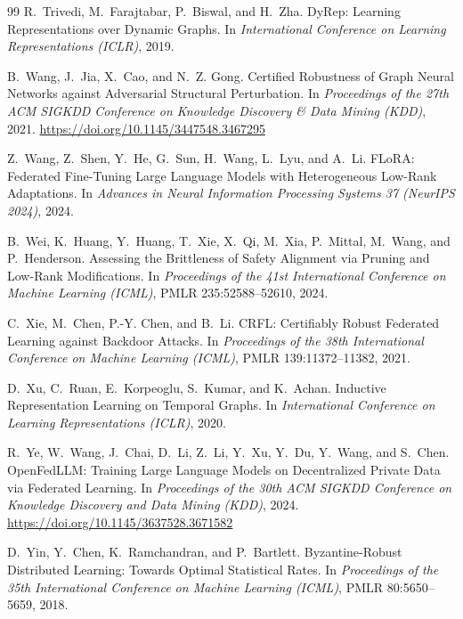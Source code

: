 \begin{thebibliography}{99}
R.~Trivedi, M.~Farajtabar, P.~Biswal, and H.~Zha.
\newblock DyRep: Learning Representations over Dynamic Graphs.
\newblock In \emph{International Conference on Learning Representations (ICLR)}, 2019.

B.~Wang, J.~Jia, X.~Cao, and N.~Z. Gong.
\newblock Certified Robustness of Graph Neural Networks against Adversarial Structural Perturbation.
\newblock In \emph{Proceedings of the 27th ACM SIGKDD Conference on Knowledge Discovery \& Data Mining (KDD)}, 2021.
\newblock \url{https://doi.org/10.1145/3447548.3467295}

Z.~Wang, Z.~Shen, Y.~He, G.~Sun, H.~Wang, L.~Lyu, and A.~Li.
\newblock FLoRA: Federated Fine-Tuning Large Language Models with Heterogeneous Low-Rank Adaptations.
\newblock In \emph{Advances in Neural Information Processing Systems 37 (NeurIPS 2024)}, 2024.

B.~Wei, K.~Huang, Y.~Huang, T.~Xie, X.~Qi, M.~Xia, P.~Mittal, M.~Wang, and P.~Henderson.
\newblock Assessing the Brittleness of Safety Alignment via Pruning and Low-Rank Modifications.
\newblock In \emph{Proceedings of the 41st International Conference on Machine Learning (ICML)}, PMLR 235:52588--52610, 2024.

C.~Xie, M.~Chen, P.-Y. Chen, and B.~Li.
\newblock CRFL: Certifiably Robust Federated Learning against Backdoor Attacks.
\newblock In \emph{Proceedings of the 38th International Conference on Machine Learning (ICML)}, PMLR 139:11372--11382, 2021.

D.~Xu, C.~Ruan, E.~Korpeoglu, S.~Kumar, and K.~Achan.
\newblock Inductive Representation Learning on Temporal Graphs.
\newblock In \emph{International Conference on Learning Representations (ICLR)}, 2020.

R.~Ye, W.~Wang, J.~Chai, D.~Li, Z.~Li, Y.~Xu, Y.~Du, Y.~Wang, and S.~Chen.
\newblock OpenFedLLM: Training Large Language Models on Decentralized Private Data via Federated Learning.
\newblock In \emph{Proceedings of the 30th ACM SIGKDD Conference on Knowledge Discovery and Data Mining (KDD)}, 2024.
\newblock \url{https://doi.org/10.1145/3637528.3671582}

D.~Yin, Y.~Chen, K.~Ramchandran, and P.~Bartlett.
\newblock Byzantine-Robust Distributed Learning: Towards Optimal Statistical Rates.
\newblock In \emph{Proceedings of the 35th International Conference on Machine Learning (ICML)}, PMLR 80:5650--5659, 2018.


\end{thebibliography}
